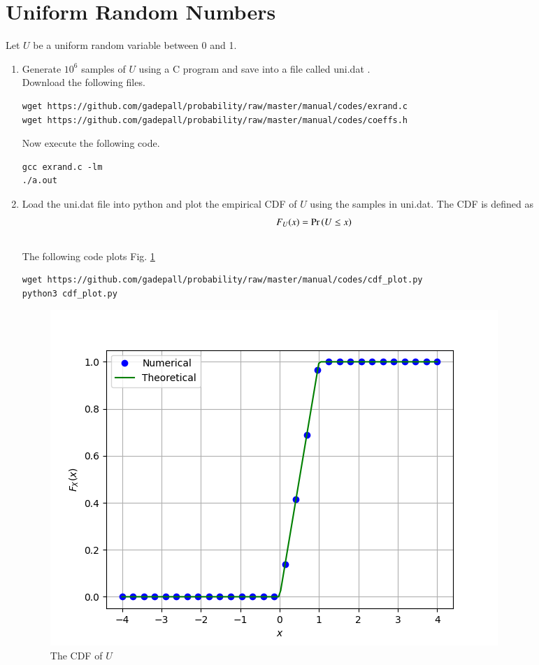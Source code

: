 \documentclass[journal,12pt,twocolumn]{IEEEtran}
\renewcommand\thesection{\arabic{section}}
\begin{document}
\section{Uniform Random Numbers}
Let $U$ be a uniform random variable between 0 and 1.
\begin{enumerate}[label=\thesection.\arabic*
,ref=\thesection.\theenumi]
\item Generate $10^6$ samples of $U$ using a C program and save into a file called uni.dat .
\\
\solution Download the following files. 
\begin{lstlisting}
wget https://github.com/gadepall/probability/raw/master/manual/codes/exrand.c
wget https://github.com/gadepall/probability/raw/master/manual/codes/coeffs.h
\end{lstlisting}

Now execute the following code.
\begin{lstlisting}
gcc exrand.c -lm
./a.out
\end{lstlisting}

%
\item
Load the uni.dat file into python and plot the empirical CDF of $U$ using the samples in uni.dat. The CDF is defined as
\begin{align}
F_{U}(x) = \Pr\left(U \le x\right)
\end{align}
\\
\solution  The following code plots Fig. \ref{fig:uni_cdf}
\begin{lstlisting}
wget https://github.com/gadepall/probability/raw/master/manual/codes/cdf_plot.py
python3 cdf_plot.py
\end{lstlisting}
\begin{figure}[!ht]
\centering
\includegraphics[width=\columnwidth]{../figs/uni_cdf.png}
\caption{The CDF of $U$}
\label{fig:uni_cdf}
\end{figure}


\end{enumerate}
\end{document}
